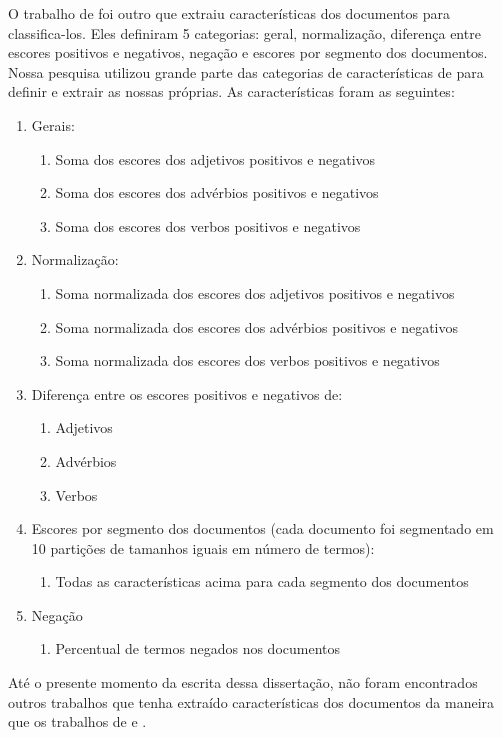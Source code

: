 \documentclass[template.tex]{subfiles}
\begin{document}
O trabalho de \cite{ohana2009sentiment} foi outro que extraiu características dos documentos para classifica-los. Eles definiram 5 categorias: geral, normalização, diferença entre escores positivos e negativos, negação e escores por segmento dos documentos. Nossa pesquisa utilizou grande parte das categorias de características de \cite{ohana2009sentiment} para definir e extrair as nossas próprias. As características foram as seguintes:
\begin{enumerate}
\item Gerais:
\begin{enumerate}
\item Soma dos escores dos adjetivos positivos e negativos
\item Soma dos escores dos advérbios positivos e negativos
\item Soma dos escores dos verbos positivos e negativos
\end{enumerate}
\item Normalização:
\begin{enumerate}
\item Soma normalizada dos escores dos adjetivos positivos e negativos
\item Soma normalizada dos escores dos advérbios positivos e negativos
\item Soma normalizada dos escores dos verbos positivos e negativos
\end{enumerate}
\item Diferença entre os escores positivos e negativos de:
\begin{enumerate}
\item Adjetivos
\item Advérbios
\item Verbos
\end{enumerate}
\item Escores por segmento dos documentos (cada documento foi segmentado em 10 partições de tamanhos iguais em número de termos):
\begin{enumerate}
\item Todas as características acima para cada segmento dos documentos
\end{enumerate}
\item Negação
\begin{enumerate}
\item Percentual de termos negados nos documentos
\end{enumerate}
\end{enumerate}

Até o presente momento da escrita dessa dissertação, não foram encontrados outros trabalhos que tenha extraído características dos documentos da maneira que os trabalhos de \cite{wilson2005recognizing} e \cite{ohana2009sentiment}.
\end{document}

